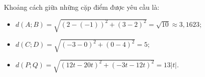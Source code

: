 Khoảng cách giữa những cặp điểm được yêu cầu là:
\begin{itemize}
   \item $d(A;B) = \sqrt{\left(2-(-1)\right)^2+\left(3-2\right)^2} = \sqrt{10} \approx 3{,}1623$;
   \item $d(C;D) = \sqrt{\left(-3-0\right)^2+\left(0-4\right)^2} = 5$;
   \item $d(P;Q) = \sqrt{\left(12t-20t\right)^2+\left(-3t-12t\right)^2} = 13|t|$.
\end{itemize}
